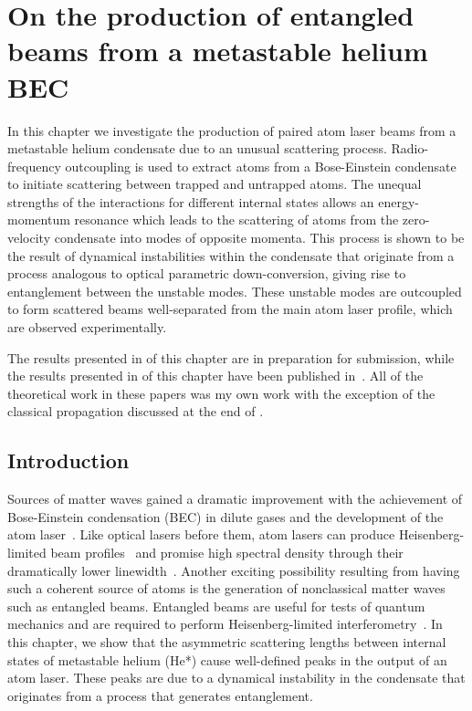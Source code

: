 \chapter{On the production of entangled beams from a metastable helium BEC}
\label{Peaks}
\graphicspath{{Figures/Peaks/}{Figures/Common/}}

In this chapter we investigate the production of paired atom laser beams from a metastable helium condensate due to an unusual scattering process.  Radio-frequency outcoupling is used to extract atoms from a Bose-Einstein condensate to initiate scattering between trapped and untrapped atoms.  The unequal strengths of the interactions for different internal states allows an energy-momentum resonance which leads to the scattering of atoms from the zero-velocity condensate into modes of opposite momenta.  This process is shown to be the result of dynamical instabilities within the condensate that originate from a process analogous to optical parametric down-conversion, giving rise to entanglement between the unstable modes.  These unstable modes are outcoupled to form scattered beams well-separated from the main atom laser profile, which are observed experimentally.

The results presented in  of this chapter are in preparation for submission, while the results presented in  of this chapter have been published in~\citet{Dall:2009}.  All of the theoretical work in these papers was my own work with the exception of the classical propagation discussed at the end of .


\section{Introduction}
Sources of matter waves gained a dramatic improvement with the achievement of Bose-Einstein condensation (BEC) in dilute gases and the development of the atom laser~\citep{Anderson:1995vn,Mewes:1997}. Like optical lasers before them, atom lasers can produce Heisenberg-limited beam profiles~\citep{Busch:2002zr,Riou:2006uq} and promise high spectral density through their dramatically lower linewidth~\citep{Wiseman:1997ba}. Another exciting possibility resulting from having such a coherent source of atoms is the generation of nonclassical matter waves such as entangled beams. Entangled beams are useful for tests of quantum mechanics and are required to perform Heisenberg-limited interferometry~\citep{Dowling:1998,Reid:1988}.  In this chapter, we show that the asymmetric scattering lengths between internal states of metastable helium (He*) cause well-defined peaks in the output of an atom laser.  These peaks are due to a dynamical instability in the condensate that originates from a process that generates entanglement.

